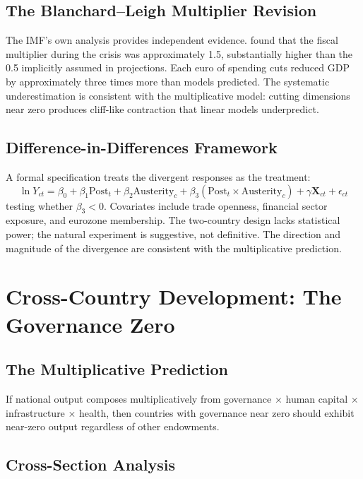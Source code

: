 \documentclass[12pt]{article}
\begin{document}
\subsection{The Blanchard--Leigh Multiplier Revision}

The IMF's own analysis provides independent evidence. \citet{blanchard2013} found that the fiscal multiplier during the crisis was approximately 1.5, substantially higher than the 0.5 implicitly assumed in projections. Each euro of spending cuts reduced GDP by approximately three times more than models predicted. The systematic underestimation is consistent with the multiplicative model: cutting dimensions near zero produces cliff-like contraction that linear models underpredict.

\subsection{Difference-in-Differences Framework}

A formal specification treats the divergent responses as the treatment:
\begin{equation}
\label{eq:did}
\ln Y_{ct} = \beta_0 + \beta_1 \text{Post}_t + \beta_2 \text{Austerity}_c + \beta_3 (\text{Post}_t \times \text{Austerity}_c) + \gamma \mathbf{X}_{ct} + \epsilon_{ct}
\end{equation}
testing whether $\beta_3 < 0$. Covariates include trade openness, financial sector exposure, and eurozone membership. The two-country design lacks statistical power; the natural experiment is suggestive, not definitive. The direction and magnitude of the divergence are consistent with the multiplicative prediction.


\section{Cross-Country Development: The Governance Zero}
\label{sec:development}

\subsection{The Multiplicative Prediction}

If national output composes multiplicatively from governance $\times$ human capital $\times$ infrastructure $\times$ health, then countries with governance near zero should exhibit near-zero output regardless of other endowments.

\subsection{Cross-Section Analysis}
\end{document}
